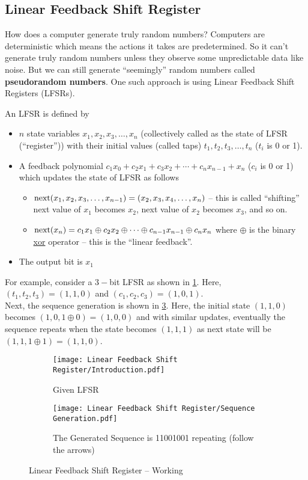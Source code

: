 \subsection{Linear Feedback Shift Register}
How does a computer generate truly random numbers? Computers are deterministic which means the actions it takes are predetermined. So it can’t generate truly random numbers unless they observe some unpredictable data like noise. But we can still generate “seemingly” random numbers called \textbf{pseudorandom numbers}. One such approach is using Linear Feedback Shift Registers (LFSRs).

An LFSR is defined by
\begin{itemize}	
	\item $n$ state variables $x_1, x_2, x_3,\ldots, x_n$ (collectively called as the state of LFSR (``register'')) with their initial values (called taps) $t_1, t_2, t_3,\ldots, t_n$ ($t_i$ is 0 or 1).
	\item A feedback polynomial $c_1x_0 + c_2x_1 + c_3x_2 + \cdots +  c_nx_{n-1} + x_n$ ($c_i$ is 0 or 1) which updates the state of LFSR as follows
	\begin{itemize}
		\item $\operatorname{next}(x_1, x_2, x_3,\ldots, x_{n-1}) = (x_2, x_3, x_4,\ldots, x_n)$ -- this is called ``shifting'' next value of $x_1$ becomes $x_2$, next value of $x_2$ becomes $x_3$, and so on.
		\item $\operatorname{next}(x_n) =  c_1x_1 \oplus c_2x_2 \oplus \cdots \oplus c_{n-1}x_{n-1}\oplus c_nx_n$ where $\oplus$ is the binary \href{https://en.wikipedia.org/wiki/Exclusive_or}{xor} operator -- this is the ``linear feedback''.
	\end{itemize}
	\item The output bit is $x_1$
\end{itemize}
For example, consider a $3-$bit LFSR as shown in \ref{fig:lfsrintro}. Here, $(t_1,t_2,t_3)=(1,1,0)$ and $(c_1,c_2,c_3)=(1,0,1)$.\\
Next, the sequence generation is shown in \ref{fig:lfsrgeneration}. Here, the initial state $(1,1,0)$ becomes $(1,0,1\oplus0) = (1,0,0)$ and with similar updates, eventually the sequence repeats when the state becomes $(1,1,1)$ as next state will be $(1,1,1\oplus1) = (1,1,0)$.
\begin{figure}[H]
	\centering
	\begin{subfigure}[c]{0.4\linewidth}
		\centering
		\texttt{[image: Linear Feedback Shift Register/Introduction.pdf]}
		\caption{Given LFSR}
		\label{fig:lfsrintro}
	\end{subfigure}
	\begin{subfigure}[c]{0.5\linewidth}
		\centering
		\texttt{[image: Linear Feedback Shift Register/Sequence Generation.pdf]}
		\caption{The Generated Sequence is 11001001 repeating (follow the arrows)}
		\label{fig:lfsrgeneration}
	\end{subfigure}
	\caption{Linear Feedback Shift Register -- Working}
\end{figure}
